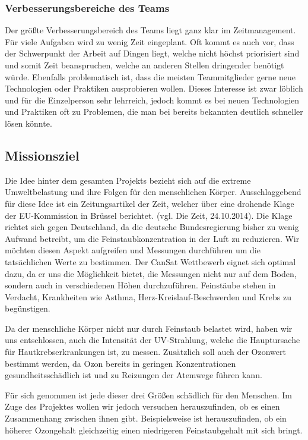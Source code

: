 \subsubsection{Verbesserungsbereiche des Teams}
Der größte Verbesserungsbereich des Teams liegt ganz klar im Zeitmanagement. Für viele Aufgaben wird zu wenig Zeit eingeplant. Oft kommt es auch vor, dass der Schwerpunkt der Arbeit auf Dingen liegt, welche nicht höchst priorisiert sind und somit Zeit beanspruchen, welche an anderen Stellen dringender benötigt würde. Ebenfalls problematisch ist, dass die meisten Teammitglieder gerne neue Technologien oder Praktiken ausprobieren wollen. Dieses Interesse ist zwar löblich und für die Einzelperson sehr lehrreich, jedoch kommt es bei neuen Technologien und Praktiken oft zu Problemen, die man bei bereits bekannten deutlich schneller lösen könnte.

\subsection{Missionsziel}
Die Idee hinter dem gesamten Projekts bezieht sich auf die extreme Umweltbelastung und ihre Folgen für den menschlichen Körper. Ausschlaggebend für diese Idee ist ein Zeitungsartikel der Zeit, welcher über eine drohende Klage der EU-Kommission in Brüssel berichtet. (vgl. Die Zeit, 24.10.2014). Die Klage richtet sich gegen Deutschland, da die deutsche Bundesregierung bisher zu wenig Aufwand betreibt, um die Feinstaubkonzentration in der Luft zu reduzieren. Wir möchten diesen Aspekt aufgreifen und Messungen durchführen um die tatsächlichen Werte zu bestimmen. Der CanSat Wettbewerb eignet sich optimal dazu, da er uns die Möglichkeit bietet, die Messungen nicht nur auf dem Boden, sondern auch in verschiedenen Höhen durchzuführen. Feinstäube stehen in Verdacht, Krankheiten wie Asthma, Herz-Kreislauf-Beschwerden und Krebs zu begünstigen.

Da der menschliche Körper nicht nur durch Feinstaub belastet wird, haben wir uns entschlossen, auch die Intensität der UV-Strahlung, welche die Hauptursache für Hautkrebserkrankungen ist, zu messen. Zusätzlich soll auch der Ozonwert bestimmt werden, da Ozon bereits in geringen Konzentrationen gesundheitsschädlich ist und zu Reizungen der Atemwege führen kann.

Für sich genommen ist jede dieser drei Größen schädlich für den Menschen. Im Zuge des Projektes wollen wir jedoch versuchen herauszufinden, ob es einen Zusammenhang zwischen ihnen gibt. Beispielsweise ist herauszufinden, ob ein höherer Ozongehalt gleichzeitig einen niedrigeren Feinstaubgehalt mit sich bringt.

